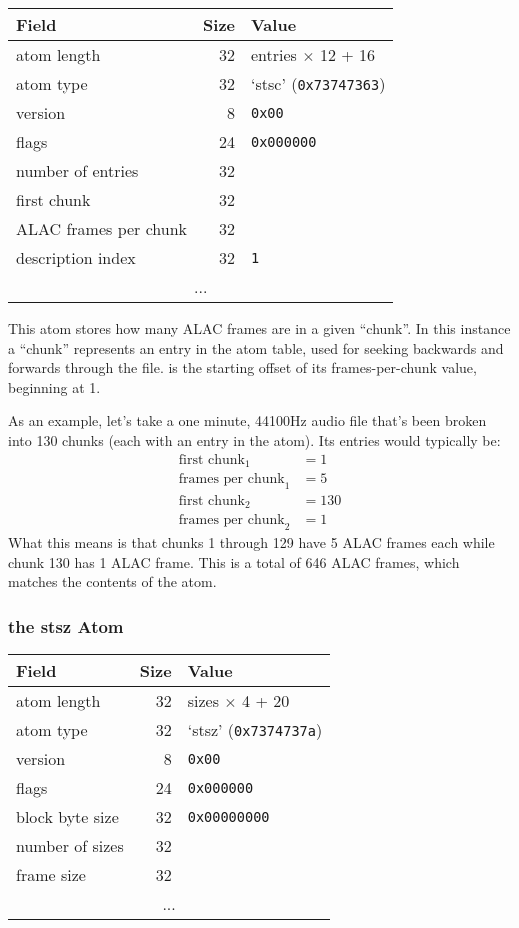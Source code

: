 \begin{table}[h]
\begin{tabular}{|l|r|l|}
\hline
Field & Size & Value \\
\hline
atom length & 32 & entries $\times$ 12 + 16 \\
atom type & 32 & `stsc' (\texttt{0x73747363}) \\
\hline
version & 8 & \texttt{0x00} \\
flags & 24 & \texttt{0x000000} \\
number of entries & 32 & \\
\hline
first chunk & 32 & \\
ALAC frames per chunk & 32 & \\
description index & 32 & \texttt{1} \\
\hline
\multicolumn{3}{|c|}{...} \\
\hline
\end{tabular}
\end{table}

This atom stores how many ALAC frames are in a given ``chunk''.
In this instance a ``chunk'' represents an entry in
the  atom table, used for seeking backwards and forwards
through the file.
 is the starting offset of its frames-per-chunk
value, beginning at 1.

As an example, let's take a one minute, 44100Hz audio file
that's been broken into 130 chunks
(each with an entry in the  atom).
Its  entries would typically be:
\begin{align*}
\text{first chunk}_1 &= 1 \\
\text{frames per chunk}_1 &= 5 \\
\text{first chunk}_2 &= 130 \\
\text{frames per chunk}_2 &= 1
\end{align*}
What this means is that chunks 1 through 129 have 5 ALAC frames each
while chunk 130 has 1 ALAC frame.
This is a total of 646 ALAC frames, which matches the contents of
the  atom.

\subsubsection{the stsz Atom}

\begin{tabular}{|l|r|l|}
\hline
Field & Size & Value \\
\hline
atom length & 32 & sizes $\times$ 4 + 20 \\
atom type & 32 & `stsz' (\texttt{0x7374737a}) \\
\hline
version & 8 & \texttt{0x00} \\
flags & 24 & \texttt{0x000000} \\
block byte size & 32 & \texttt{0x00000000} \\
number of sizes & 32 & \\
\hline
frame size & 32 & \\
\hline
\multicolumn{3}{|c|}{...} \\
\hline
\end{tabular}

